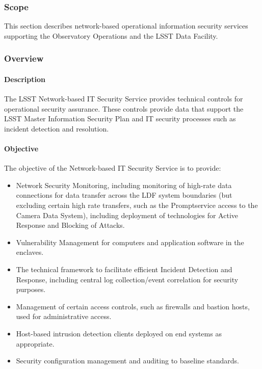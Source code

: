 \subsubsection{Scope}

This section describes network-based operational information security services
supporting the Observatory Operations and the LSST Data Facility.

\subsubsection{Overview}

\paragraph{Description}

The LSST Network-based IT Security Service provides technical controls for
operational security assurance. These controls provide data that support the
LSST Master Information Security Plan and IT security processes such as incident
detection and resolution.

\paragraph{Objective}

The objective of the Network-based IT Security Service is to provide:

\begin{itemize}
\item Network Security Monitoring, including monitoring of high-rate data
connections for data transfer across the LDF system boundaries (but excluding
certain high rate transfers, such as the Promptservice access to the Camera
Data System), including deployment of technologies for Active Response and
Blocking of Attacks.
\item Vulnerability Management for computers and application software in the
enclaves.
\item The technical framework to facilitate efficient Incident Detection and
Response, including central log collection/event correlation for security purposes.
\item Management of certain access controls, such as firewalls and bastion hosts,
used for administrative access.
\item Host-based intrusion detection clients deployed on end systems as
appropriate.
\item Security configuration management and auditing to baseline standards.
\end{itemize}

